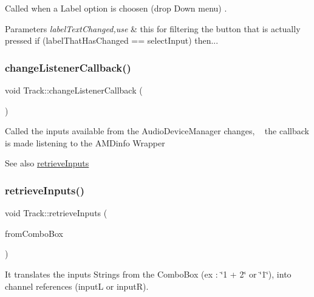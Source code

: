 Called when a Label option is choosen (drop Down menu) . 
\begin{DoxyParams}{Parameters}
{\em label\+Text\+Changed,use} & this for filtering the button that is actually pressed if (label\+That\+Has\+Changed == select\+Input) then... \\
\hline
\end{DoxyParams}
\mbox{\label{class_track_a84b1934243994bd64120e4cc79f8a054}} 
\subsubsection{\texorpdfstring{changeListenerCallback()}{changeListenerCallback()}}
{\footnotesize\ttfamily void Track\+::change\+Listener\+Callback (\begin{DoxyParamCaption}\item[{Change\+Broadcaster $\ast$}]{ }\end{DoxyParamCaption})\hspace{0.3cm}{\ttfamily [override]}}

Called the inputs available from the Audio\+Device\+Manager changes, ~\newline
 the callback is made listening to the A\+M\+Dinfo Wrapper \begin{DoxySeeAlso}{See also}
\mbox{\hyperlink{class_track_ac20c0787d81235fde26e08c133998450}{retrieve\+Inputs}} 
\end{DoxySeeAlso}
\mbox{\label{class_track_ac20c0787d81235fde26e08c133998450}} 
\subsubsection{\texorpdfstring{retrieveInputs()}{retrieveInputs()}}
{\footnotesize\ttfamily void Track\+::retrieve\+Inputs (\begin{DoxyParamCaption}\item[{String}]{from\+Combo\+Box }\end{DoxyParamCaption})}

It translates the inputs Strings from the Combo\+Box (ex \+: \char`\"{}1 + 2\char`\"{} or \char`\"{}1\char`\"{}), into channel references (inputL or inputR). \mbox{\label{class_track_abf06d5a33a170a0c903f765a01fb6f23}} 
